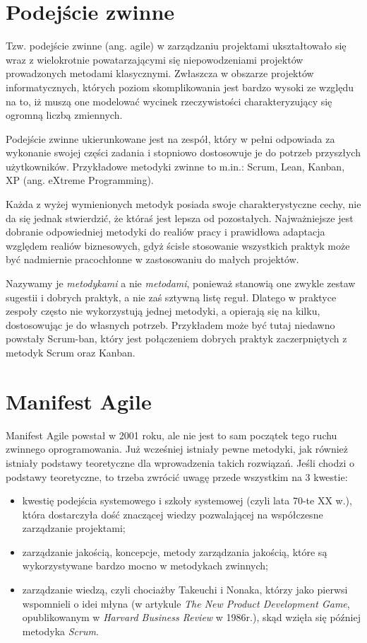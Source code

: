 \section{Podejście zwinne}

Tzw. podejście zwinne (ang. agile) w zarządzaniu projektami ukształtowało się
wraz z wielokrotnie powatarzającymi się niepowodzeniami projektów prowadzonych
metodami klasycznymi. Zwłaszcza w obszarze projektów informatycznych, których
poziom skomplikowania jest bardzo wysoki ze względu na to, iż muszą one modelować
wycinek rzeczywistości charakteryzujący się ogromną liczbą zmiennych.

Podejście zwinne ukierunkowane jest na zespół, który w pełni odpowiada za wykonanie swojej części
zadania i stopniowo dostosowuje je do potrzeb przyszłych użytkowników.
Przykładowe metodyki zwinne to m.in.: Scrum, Lean, Kanban, XP (ang. eXtreme Programming).

Każda z wyżej wymienionych metodyk posiada swoje charakterystyczne cechy,
nie da się jednak stwierdzić, że któraś jest lepsza od pozostałych.
Najważniejsze jest dobranie odpowiedniej metodyki do realiów pracy
i prawidłowa adaptacja względem realiów biznesowych,
gdyż ścisłe stosowanie wszystkich praktyk może być nadmiernie pracochłonne
w zastosowaniu do małych projektów.

Nazywamy je \textit{metodykami} a nie \textit{metodami}, ponieważ stanowią one
zwykle zestaw sugestii i dobrych praktyk, a nie zaś sztywną listę reguł.
Dlatego w praktyce zespoły często nie wykorzystują jednej metodyki, a opierają się na kilku,
dostosowując je do własnych potrzeb.
Przykładem może być tutaj niedawno powstały Scrum-ban, który jest połączeniem
dobrych praktyk zaczerpniętych z metodyk Scrum oraz Kanban.
~\cite{Wolf_2012}


\section{Manifest Agile}

Manifest Agile powstał w 2001 roku, ale nie jest to sam początek tego ruchu zwinnego oprogramowania.
Już wcześniej istniały pewne metodyki, jak również istniały podstawy teoretyczne
dla wprowadzenia takich rozwiązań. Jeśli chodzi o podstawy teoretyczne,
to trzeba zwrócić uwagę przede wszystkim na 3 kwestie:
\begin{itemize}
	\item kwestię podejścia systemowego i szkoły systemowej (czyli lata 70-te XX w.),
	która dostarczyła dość znaczącej wiedzy pozwalającej na współczesne zarządzanie projektami;
	\item zarządzanie jakością, koncepcje, metody zarządzania jakością,
	które są wykorzystywane bardzo mocno w metodykach zwinnych;
	\item zarządzanie wiedzą, czyli chociażby Takeuchi i Nonaka,
	którzy jako pierwsi wspomnieli o idei młyna (w artykule \textit{The New Product Development Game},
	opublikowanym w \textit{Harvard Business Review} w 1986r.), skąd wzięła się później metodyka \textit{Scrum}.
\end{itemize}

